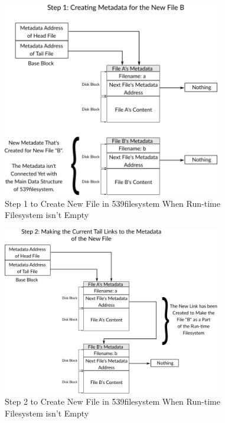\begin{figure}
\centering
\includegraphics[width=0.85000\textwidth]{Figures/filesystem-ch/create_file_not_empty_case_step1.png}
\caption{Step 1 to Create New File in 539filesystem When Run-time
Filesystem isn't Empty}\label{fig:create_file_not_empty_case_1}
\end{figure}

\begin{figure}
\centering
\includegraphics[width=0.85000\textwidth]{Figures/filesystem-ch/create_file_not_empty_case_step2.png}
\caption{Step 2 to Create New File in 539filesystem When Run-time
Filesystem isn't Empty}\label{fig:create_file_not_empty_case_2}
\end{figure}

